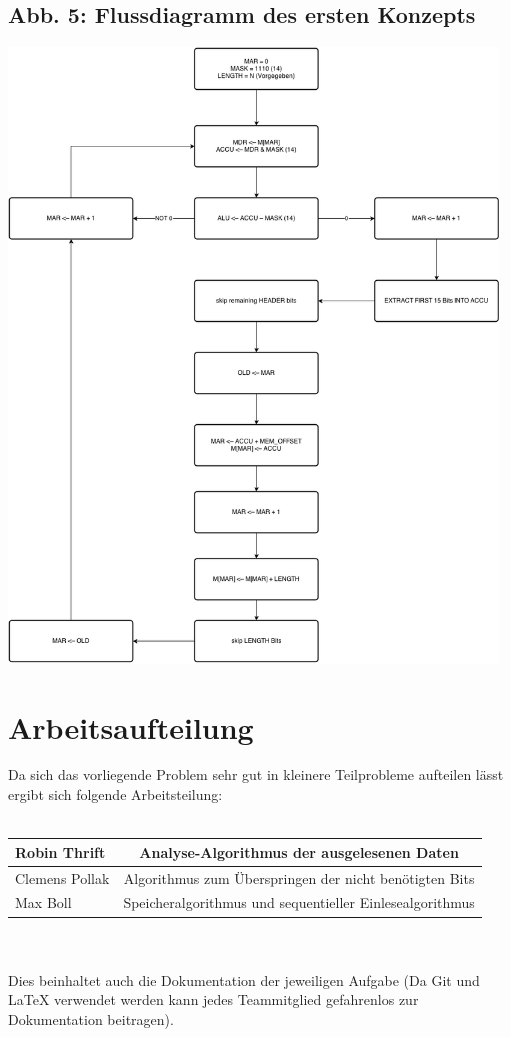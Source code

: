 \documentclass[12pt,titlepage]{article}
\begin{document}
\subsection{Abb. 5: Flussdiagramm des ersten Konzepts}
\includegraphics[width=13cm]{algo_flow.png}

\newpage

\section{Arbeitsaufteilung}
Da sich das vorliegende Problem sehr gut in kleinere Teilprobleme aufteilen lässt ergibt sich folgende 
Arbeitsteilung:
\leavevmode \\
\\
\begin{tabular}{|l|c|}
\hline
Robin Thrift &  Analyse-Algorithmus der ausgelesenen Daten\\
\hline
Clemens Pollak & Algorithmus zum Überspringen der nicht benötigten Bits \\
\hline
Max Boll & Speicheralgorithmus und sequentieller Einlesealgorithmus \\
\hline
\end{tabular}
\leavevmode \\
\\
Dies beinhaltet auch die Dokumentation der jeweiligen Aufgabe (Da Git und LaTeX verwendet werden kann jedes 
Teammitglied gefahrenlos zur Dokumentation beitragen).
\end{document}
